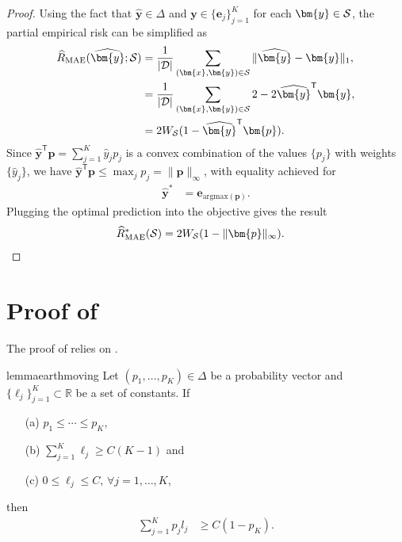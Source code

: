 \documentclass[letterpaper]{article} %
\newcommand{\R}{{\mathbb{R}}}
\newcommand{\bx}{{\bm{x}}}
\newcommand{\bp}{{\bm{p}}}
\newcommand{\by}{{\bm{y}}}
\newcommand{\be}{{\bm{e}}}
\newcommand{\T}{{\mathsf{T}}}
\newcommand{\cS}{{\cal{S}}}
\newcommand{\cD}{{\cal{D}}}
\newcommand{\WS}{{W_{\cal{S}}}}
\newcommand{\simplex}{\Delta}
\newcommand{\argmax}{\mathrm{argmax}}
\newtheorem{lemma}[theorem]{Lemma}
\begin{document}
\begin{proof}
    \medskip{} 
    Using the fact that $\widehat{\by} \in \simplex$ and $\by\in\{\be_j\}_{j=1}^K$ for each $\by\in\cS$, the partial empirical risk can be simplified as
    \begin{align*}
        \widehat{R}_{\mathrm{MAE}}(\widehat{\by};\cS) &=  \frac{1}{|\cD|}\sum_{(\bx,\by)\in\cS} \|\widehat{\by}-\by\|_1,
        \\
        &= \frac{1}{|\cD|} \sum_{(\bx,\by)\in\cS} 2-2\widehat{\by}^\T\by,
        \\
        &= 2\WS(1-\widehat{\by}^\T\bp).
    \end{align*}
    Since $\widehat{\by}^\T\bp=\sum_{j=1}^K \widehat{y}_jp_j$ is a convex combination of the values $\{p_j\}$ with weights $\{\widehat{y}_j\}$, we have $\widehat{\by}^\T\bp\leq \max_{j} p_j=\|\bp\|_\infty$, with equality achieved for 
    \begin{align*}
        \widehat{\by}^* &= \be_{\argmax(\bp)}.
    \end{align*}
    Plugging the optimal prediction into the objective gives the result
    \begin{align*}
        \widehat{R}_{\mathrm{MAE}}^*(\cS) &= 2\WS(1-\|\bp\|_\infty). \qedhere
    \end{align*}
\end{proof}


\section{Proof of }
\label{app:proof_universal}
The proof of  relies on .

\begin{restatable}[]{lemma}{earthmoving}
\label{lemma:earth-moving} 
Let $(p_1,\ldots,p_K) \in \simplex$ be a probability vector and $\{\ell_j\}_{j=1}^K\subset \R$ be a set of constants. If 
\begin{enumerate}
    \item[(a)] $p_1\leq \cdots\leq p_K$, 
    \item[(b)] $\sum_{j=1}^K \ell_j\geq C(K-1)$ and 
    \item[(c)] $0\leq \ell_j\leq C,\,\forall j=1,\ldots,K$, 
\end{enumerate}
then
\begin{align}
    \sum_{j=1}^K p_j l_j &\geq C(1-p_K). \label{eq:earthmoving}
\end{align}
\end{restatable}
\end{document}
